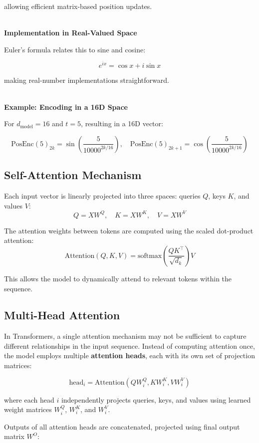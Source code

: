 allowing efficient matrix-based position updates.

${}$\\
\textbf{Implementation in Real-Valued Space}

Euler’s formula relates this to sine and cosine:

\[
e^{i x} = \cos x + i \sin x
\]

making real-number implementations straightforward.

${}$\\
\textbf{Example: Encoding in a 16D Space}

For $d_{\text{model}} = 16$ and $t=5$, resulting in a 16D vector:

\[
\text{PosEnc}(5)_{2k} = \sin\left(\frac{5}{10000^{2k/16}}\right), \quad
\text{PosEnc}(5)_{2k+1} = \cos\left(\frac{5}{10000^{2k/16}}\right)
\]

\subsection{Self-Attention Mechanism}

Each input vector is linearly projected into three spaces: queries $Q$, keys $K$, and values $V$:
\[
Q = XW^Q, \quad K = XW^K, \quad V = XW^V
\]

The attention weights between tokens are computed using the scaled dot-product attention:
\[
\text{Attention}(Q, K, V) = \text{softmax} \left( \frac{QK^\top}{\sqrt{d_k}} \right)V
\]

This allows the model to dynamically attend to relevant tokens within the sequence.

\subsection{Multi-Head Attention}

In Transformers, a single attention mechanism may not be sufficient to capture different relationships in the input sequence. Instead of computing attention once, the model employs multiple \textbf{attention heads}, each with its own set of projection matrices:

\[
\text{head}_i = \text{Attention}(QW_i^Q, KW_i^K, VW_i^V)
\]

where each head $i$ independently projects queries, keys, and values using learned weight matrices $W_i^Q$, $W_i^K$, and $W_i^V$.

Outputs of all attention heads are concatenated, projected using final output matrix $W^O$:

